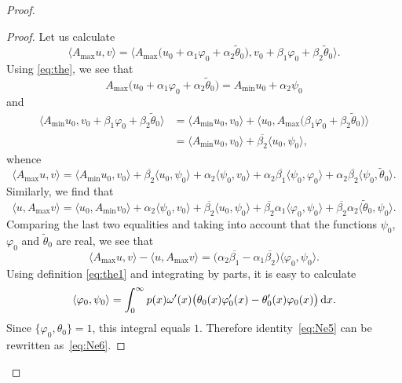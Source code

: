 \documentclass[pdftex]{sigma}%
\numberwithin{equation}{section}
\begin{document}
\begin{proof}
 \begin{proof}
 Let us calculate
 \[
\langle A_{\max} u,v\rangle = \big\langle A_{\max} \big(u_{0}+ \alpha_{1} \varphi_{0}+ \alpha_{2} \tilde{\theta}_{0 }\big),v_{0}+ \beta_{1} \varphi_0+ \beta_{2} \tilde{\theta}_{0 }\big\rangle.
 \]
 Using \eqref{eq:the}, we see that
 \[
 A_{\max} \big(u_{0}+ \alpha_{1} \varphi_{0}+ \alpha_{2} \tilde{\theta}_{0 }\big)= A_{\min} u_{0} + \alpha_{2}\psi_{0}
 \]
 and
 \begin{align*}
\big \langle A_{\min} u_{0} ,v_{0}+ \beta_{1} \varphi_0+ \beta_{2} \tilde{\theta}_{0 }\big\rangle
 & =
 \langle A_{\min} u_{0} ,v_{0}\rangle + \big\langle u_{0} , A_{\max} \big(\beta_{1} \varphi_0+ \beta_{2} \tilde{\theta}_{0 }\big)\big\rangle
\nonumber \\
 & = \langle A_{\min} u_{0} ,v_{0}\rangle + \overline{\beta_{2}} \langle u_{0} , \psi_{0}\rangle,
 \end{align*}
 whence
 \[
\langle A_{\max} u,v\rangle = \langle A_{\min} u_{0} ,v_{0}\rangle + \overline{\beta_{2}} \langle u_{0} , \psi_{0}\rangle
+ \alpha_{2} \langle \psi_{0},v_{0}\rangle
+ \alpha_{2}\overline{\beta_{1}} \langle \psi_{0} , \varphi_{0}\rangle
+ \alpha_{2}\overline{\beta_{2}} \big\langle \psi_{0} , \tilde{\theta}_{0}\big\rangle .
 \]
 Similarly, we find that
 \[
\langle u, A_{\max} v\rangle = \langle u_{0} , A_{\min}v_{0}\rangle + \alpha_{2} \langle \psi_{0}, v_{0}\rangle
+ \overline{\beta_{2}}\langle u_{0}, \psi_{0}\rangle
+ \overline{\beta_{2}}\alpha_{1}\langle \varphi_{0}, \psi_{0}\rangle
+ \overline{\beta_{2}}\alpha_{2} \big\langle \tilde{\theta}_{0}, \psi_{0}\big\rangle .
 \]
 Comparing the last two equalities and taking into account that the functions $\psi_{0}$, $\varphi_{0}$ and $\tilde{\theta}_{0}$ are real, we see that
 \begin{equation}
\langle A_{\max} u,v\rangle - \langle u, A_{\max} v \rangle= \big(\alpha_{2} \overline{\beta_{1}} - \alpha_{1} \overline{\beta_{2}} \big)\langle \varphi_{0}, \psi_{0}\rangle.
 \label{eq:Ne5}\end{equation}
 Using definition \eqref{eq:the1} and integrating by parts, it is easy to calculate
 \[
 \langle \varphi_{0}, \psi_{0}\rangle=\int_{0}^\infty p(x) \omega'(x) \big(\theta_{0} (x)\varphi_{0}' (x) - \theta'_{0} (x)\varphi_{0} (x)
 \big) \,{\rm d}x.
 \]
 Since $\{ \varphi_{0}, \theta_{0}\}=1$, this integral equals $1$. Therefore identity~\eqref{eq:Ne5} can be rewritten as~\eqref{eq:Ne6}.
 \end{proof}


\end{proof}
\end{document}
